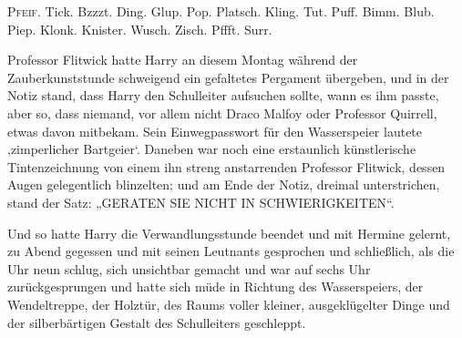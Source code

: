 
\lettrine{P}{feif.} Tick. Bzzzt. Ding. Glup. Pop. Platsch. Kling. Tut. Puff. Bimm. Blub. Piep. Klonk. Knister. Wusch. Zisch. Pffft. Surr.

Professor Flitwick hatte Harry an diesem Montag während der Zauberkunststunde schweigend ein gefaltetes Pergament übergeben, und in der Notiz stand, dass Harry den Schulleiter aufsuchen sollte, wann es ihm passte, aber so, dass niemand, vor allem nicht Draco Malfoy oder Professor Quirrell, etwas davon mitbekam. Sein Einwegpasswort für den Wasserspeier lautete ‚zimperlicher Bartgeier‘.%
Daneben war noch eine erstaunlich künstlerische Tintenzeichnung von einem ihn streng anstarrenden Professor Flitwick, dessen Augen gelegentlich blinzelten; und am Ende der Notiz, dreimal unterstrichen, stand der Satz:
„GERATEN SIE NICHT IN SCHWIERIGKEITEN“.

Und so hatte Harry die Verwandlungsstunde beendet und mit Hermine gelernt, zu Abend gegessen und mit seinen Leutnants gesprochen und schließlich, als die Uhr neun schlug, sich unsichtbar gemacht und war auf sechs Uhr zurückgesprungen und hatte sich müde in Richtung des Wasserspeiers, der Wendeltreppe, der Holztür, des Raums voller kleiner, ausgeklügelter Dinge und der silberbärtigen Gestalt des Schulleiters geschleppt.

